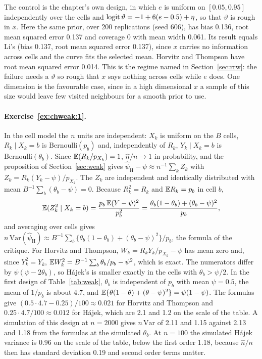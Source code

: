 The control is the chapter's own design, in which $e$ is uniform on $[0.05, 0.95]$ independently over the cells and $\operatorname{logit}\vartheta = -1 + 6(e - 0.5) + \eta$, so that $\vartheta$ is rough in $x$. Here the same prior, over 200 replications (seed 606), has bias 0.136, root mean squared error 0.137 and coverage 0 with mean width 0.061. Its result equals Li's (bias 0.137, root mean squared error 0.137), since $x$ carries no information across cells and the curve fits the selected mean. Horvitz and Thompson have root mean squared error 0.014. This is the regime named in Section~\ref{sec:rrw}: the failure needs a $\vartheta$ so rough that $x$ says nothing across cells while $e$ does. One dimension is the favourable case, since in a high dimensional $x$ a sample of this size would leave few visited neighbours for a smooth prior to use.

\paragraph{Exercise~\ref{ex:chweak:1}.} In the cell model the $n$ units are independent: $X_k$ is uniform on the $B$ cells, $R_k \mid X_k = b$ is $\mathrm{Bernoulli}(p_b)$ and, independently of $R_k$, $Y_k \mid X_k = b$ is $\mathrm{Bernoulli}(\theta_b)$. Since $\mathbb{E}(R_k/p_{X_k}) = 1$, $\hat n/n \to 1$ in probability, and the proposition of Section~\ref{sec:weak} gives $\hat\psi_{\mathrm{H}} - \psi \approx n^{-1}\sum_k Z_k$ with $Z_k = R_k(Y_k - \psi)/p_{X_k}$. The $Z_k$ are independent and identically distributed with mean $B^{-1}\sum_b(\theta_b - \psi) = 0$. Because $R_k^2 = R_k$ and $\mathbb{E} R_k = p_b$ in cell $b$,
\[
\mathbb{E}(Z_k^2 \mid X_k = b) = \frac{p_b\,\mathbb{E}(Y - \psi)^2}{p_b^2} = \frac{\theta_b(1 - \theta_b) + (\theta_b - \psi)^2}{p_b},
\]
and averaging over cells gives $n\,\mathrm{Var}(\hat\psi_{\mathrm{H}}) \approx B^{-1}\sum_b\{\theta_b(1 - \theta_b) + (\theta_b - \psi)^2\}/p_b$, the formula of the critique. For Horvitz and Thompson, $W_k = R_kY_k/p_{X_k} - \psi$ has mean zero and, since $Y_k^2 = Y_k$, $\mathbb{E} W_k^2 = B^{-1}\sum_b\theta_b/p_b - \psi^2$, which is exact. The numerators differ by $\psi(\psi - 2\theta_b)$, so H\'ajek's is smaller exactly in the cells with $\theta_b > \psi/2$. In the first design of Table~\ref{tab:weak}, $\theta_b$ is independent of $p_b$ with mean $\psi = 0.5$, the mean of $1/p_b$ is about 4.7, and $\mathbb{E}\{\theta(1 - \theta) + (\theta - \psi)^2\} = \psi(1 - \psi)$. The formulas give $(0.5 \cdot 4.7 - 0.25)/100 \approx 0.021$ for Horvitz and Thompson and $0.25 \cdot 4.7/100 \approx 0.012$ for H\'ajek, which are 2.1 and 1.2 on the scale of the table. A simulation of this design at $n = 2000$ gives $n\,\mathrm{Var}$ of 2.11 and 1.15 against 2.13 and 1.18 from the formulas at the simulated $\theta_b$. At $n = 100$ the simulated H\'ajek variance is 0.96 on the scale of the table, below the first order 1.18, because $\hat n/n$ then has standard deviation 0.19 and second order terms matter.


